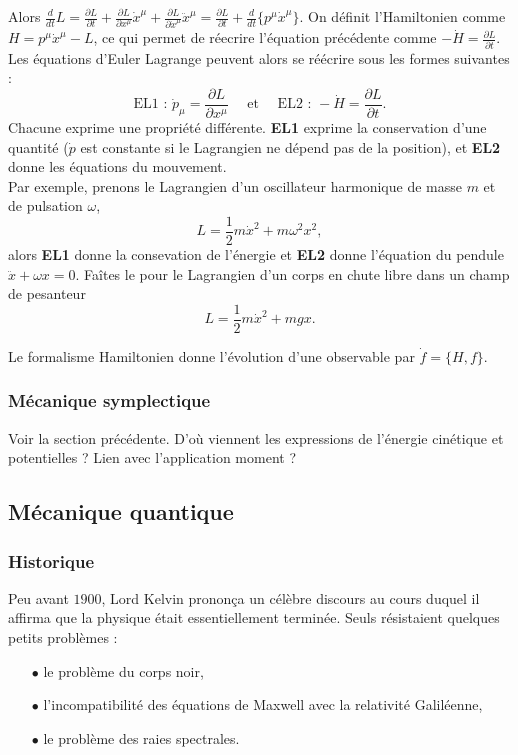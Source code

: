 Alors $\frac{d}{dt}L = \frac{\partial L}{\partial t}+\frac{\partial L}{\partial x^\mu} \dot x^\mu + \frac{\partial L}{\partial \dot x^\mu} \ddot{x}^\mu = \frac{\partial L}{\partial t}+\frac{d}{dt}\{p^\mu \dot{x}^\mu \}$.
On définit l'Hamiltonien comme $H=p^\mu \dot x^\mu-L$, ce qui permet de réecrire l'équation précédente comme $-\dot H =\frac{\partial L}{\partial t}$.\\
Les équations d'Euler Lagrange peuvent alors se réécrire sous les formes suivantes :
\[\text{EL1 : }\dot p_\mu = \frac{\partial L}{\partial x^\mu} \quad\text{ et }\quad \text{EL2 : } -\dot H =\frac{\partial L}{\partial t}. \]
Chacune exprime une propriété différente. \textbf{EL1} exprime la conservation d'une quantité ($\dot p$ est constante si le Lagrangien ne dépend pas de la position), et \textbf{EL2} donne les équations du mouvement.\\ 

Par exemple, prenons le Lagrangien d'un oscillateur harmonique de masse $m$ et de pulsation $\omega$,  
\[L=\frac{1}{2} m \dot x^2+m\omega^2x^2,\]
alors \textbf{EL1} donne la consevation de l'énergie et  \textbf{EL2} donne l'équation du pendule $\ddot x + \omega x =0$.
Faîtes le pour le Lagrangien d'un corps en chute libre dans un champ de pesanteur
\[L = \frac{1}{2}m\dot x ^2 + mgx.\]

Le formalisme Hamiltonien donne l'évolution d'une observable par $\dot f =\{H,f\}$.
\subsubsection{Mécanique symplectique}

Voir la section précédente. D'où viennent les expressions de l'énergie cinétique et potentielles ? Lien avec l'application moment ?

\subsection{Mécanique quantique}
\subsubsection{Historique}
Peu avant $1900$, Lord Kelvin prononça un célèbre discours au cours duquel il affirma que la physique était essentiellement terminée. Seuls résistaient quelques petits problèmes :\\

\begin{itemize}
\item[$\bullet$] le problème du corps noir,
\item[$\bullet$] l'incompatibilité des équations de Maxwell avec la relativité Galiléenne,
\item[$\bullet$] le problème des raies spectrales.\\
\end{itemize}

